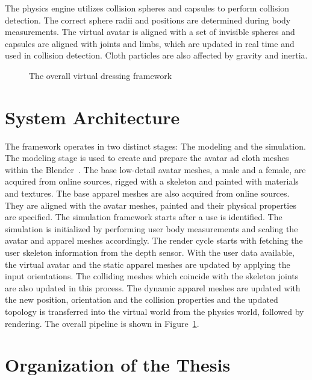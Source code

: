 The physics engine utilizes collision spheres and capsules to perform collision detection. The correct sphere radii and positions are determined during body measurements. The virtual avatar is aligned with a set of invisible spheres and capsules are aligned with joints and limbs, which are updated in real time and used in collision detection. Cloth particles are also affected by gravity and inertia.


\begin{figure}[h]
\centerline{}
\caption{The overall virtual dressing framework}
\label{fig:overall}
\end{figure}

\section{System Architecture}

The framework operates in two distinct stages: The modeling and the simulation. The modeling stage is used to create and prepare the avatar ad cloth meshes within the Blender~\cite{Blender}. The base low-detail avatar meshes, a male and a female, are acquired from online sources, rigged with a skeleton and painted with materials and textures. The base apparel meshes are also acquired from online sources. They are aligned with the avatar meshes, painted and their physical properties are specified. The simulation framework starts after a use is identified. The simulation is initialized by performing user body measurements and scaling the avatar and apparel meshes accordingly. The render cycle starts with fetching the user skeleton information from the depth sensor. With the user data available, the virtual avatar and the static apparel meshes are updated by applying the input orientations. The colliding meshes which coincide with the skeleton joints are also updated in this process. The dynamic apparel meshes are updated with the new position, orientation and the collision properties and the updated topology is transferred into the virtual world from the physics world, followed by rendering. The overall pipeline is shown in Figure~\ref{fig:overall}.  


\section{Organization of the Thesis}

